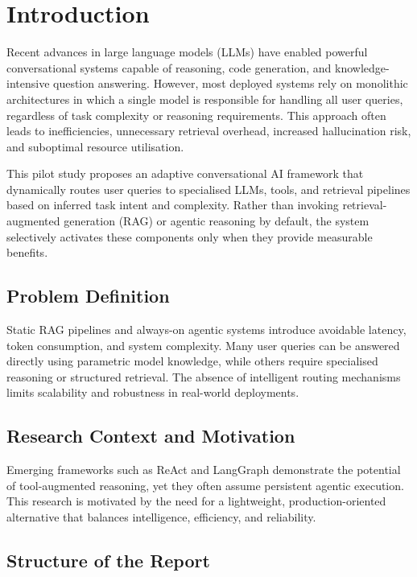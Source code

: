 \documentclass[12pt,a4paper]{article}
\begin{document}
\section{Introduction}

Recent advances in large language models (LLMs) have enabled powerful conversational systems capable of reasoning, code generation, and knowledge-intensive question answering. However, most deployed systems rely on monolithic architectures in which a single model is responsible for handling all user queries, regardless of task complexity or reasoning requirements. This approach often leads to inefficiencies, unnecessary retrieval overhead, increased hallucination risk, and suboptimal resource utilisation.

This pilot study proposes an adaptive conversational AI framework that dynamically routes user queries to specialised LLMs, tools, and retrieval pipelines based on inferred task intent and complexity. Rather than invoking retrieval-augmented generation (RAG) or agentic reasoning by default, the system selectively activates these components only when they provide measurable benefits.

\subsection{Problem Definition}

Static RAG pipelines and always-on agentic systems introduce avoidable latency, token consumption, and system complexity. Many user queries can be answered directly using parametric model knowledge, while others require specialised reasoning or structured retrieval. The absence of intelligent routing mechanisms limits scalability and robustness in real-world deployments.

\subsection{Research Context and Motivation}

Emerging frameworks such as ReAct and LangGraph demonstrate the potential of tool-augmented reasoning, yet they often assume persistent agentic execution. This research is motivated by the need for a lightweight, production-oriented alternative that balances intelligence, efficiency, and reliability.

\subsection{Structure of the Report}
\end{document}
